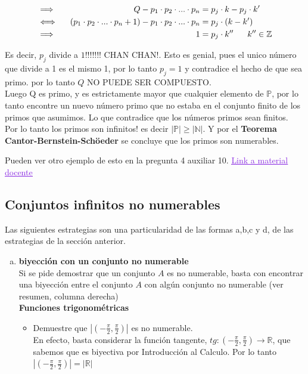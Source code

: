 \documentclass[letterpaper,12pt]{article}
\newcommand{\R}{\mathbb R}
\newcommand{\N}{\mathbb N}
\newcommand{\Z}{\mathbb Z}
\theoremstyle{plain}
\begin{document}
\begin{enumerate}[a)]
\begin{itemize}
            \begin{alignat}{2}
                &\Longrightarrow\quad &Q-p_1\cdot p_2\cdot ... \cdot p_n  &= p_j \cdot k - p_j \cdot k'\notag\\ 
                &\Longleftrightarrow & (p_1\cdot p_2\cdot ... \cdot p_n +1) - p_1\cdot p_2\cdot ... \cdot p_n&=  p_j \cdot (k - k')\notag\\  
                &\Longrightarrow & 1 &= p_j \cdot k'' ~~~~~ k'' \in \Z\notag
            \end{alignat}

    Es decir, $p_j$ divide a $1$!!!!!!! CHAN CHAN!. Esto es genial, pues el unico número que divide a 1 es el mismo 1, por lo tanto $p_j=1$ y contradice el hecho de que sea primo. por lo tanto $Q$ NO PUEDE SER COMPUESTO.\\
    
    Luego Q es primo, y es estrictamente mayor que cualquier elemento de $\mathbb{P}$, por lo tanto encontre un nuevo número primo que no estaba en el conjunto finito de los primos que asumimos. Lo que contradice que los números primos sean finitos.\\
    Por lo tanto los primos son infinitos! es decir $|\mathbb{P}|\geq |\N|$. Y por el \textbf{Teorema Cantor-Bernstein-Schöeder} se concluye que los primos son numerables.
    \end{itemize}
    
    Pueden ver otro ejemplo de esto en la pregunta 4 auxiliar 10. \href{https://www.u-cursos.cl/ingenieria/2017/1/MA1101/1/material_docente/}{\textcolor{BlueViolet}{\underline{Link a material docente}}}
    
    
    \subsection{Conjuntos infinitos no numerables}
    Las siguientes estrategias son una particularidad de las formas a,b,c y d, de las estrategias de la sección anterior.
    \begin{enumerate}[a)]
        \item \textbf{biyección con un conjunto no numerable}\\
        Si se pide demostrar que un conjunto $A$ es no numerable, basta con encontrar una biyección entre el conjunto $A$ con algún conjunto no numerable (ver resumen, columna derecha)\\
        
        \textbf{Funciones trigonométricas}\\
        \begin{itemize}
            \item  Demuestre que $|(-\frac{\pi}{2},\frac{\pi}{2})|$ es no numerable.\\
        En efecto, basta considerar la función tangente, $tg :(-\frac{\pi}{2},\frac{\pi}{2})\to \R$, que sabemos que es biyectiva por Introducción al Calculo. Por lo tanto $|(-\frac{\pi}{2},\frac{\pi}{2})|=|\R|$
        \end{itemize}
        

\end{enumerate}
\end{enumerate}
\end{document}
